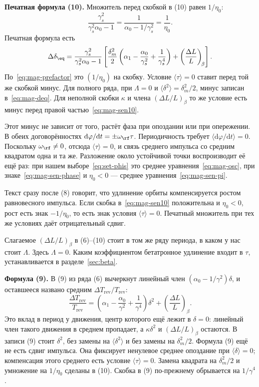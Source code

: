 \textbf{Печатная формула (10).}
Множитель перед скобкой в (10) равен $1/\eta_0$:
\begin{equation}
\label{eq:mag-prefactor}
\frac{\gamma_s^2}{\gamma_s^2\alpha_0-1}
=\frac{1}{\alpha_0-1/\gamma_s^2}
=\frac{1}{\eta_0}.
\end{equation}
Печатная формула есть
\begin{equation}
\label{eq:mag-sen10}
\Delta\delta_\eq
=\frac{\gamma_s^2}{\gamma_s^2\alpha_0-1}
\left[
\frac{\delta_m^2}{2}
\left(
\alpha_1-\frac{\alpha_0}{\gamma_s^2}+\frac{1}{\gamma_s^4}
\right)
+\left(\frac{\Delta L}{L}\right)_{\!\beta}
\right].
\end{equation}
По~\eqref{eq:mag-prefactor} это $(1/\eta_0)$ на скобку. Условие $\langle\tau\rangle=0$ ставит перед той же скобкой минус. Для полного ряда, при $\Lambda=0$ и $\langle\delta^2\rangle=\delta_m^2/2$, минус записан в~\eqref{eq:mag-deq}. Для неполной скобки $\kappa$ и члена $(\Delta L/L)_\beta$ то же условие есть минус перед правой частью~\eqref{eq:mag-sen10}.

Этот минус не зависит от того, растёт фаза при опоздании или при опережении. В обеих договорённостях $\mathrm{d}\varphi/\mathrm{d}t=\pm\omega_\rf\tau$. Периодичность требует $\langle\mathrm{d}\varphi/\mathrm{d}t\rangle=0$. Поскольку $\omega_\rf\neq 0$, отсюда $\langle\tau\rangle=0$, и связь среднего импульса со средним квадратом одна и та же. Разложение около устойчивой точки воспроизводит её ещё раз: при нашем выборе~\eqref{eq:set-phis} это среднее уравнения~\eqref{eq:mag-osc}, при знаке~\eqref{eq:mag-sen-phase} и $\eta_0<0$ --- среднее уравнения~\eqref{eq:mag-sen-pi}.

Текст сразу после (8) говорит, что удлинение орбиты компенсируется ростом равновесного импульса. Если скобка в~\eqref{eq:mag-sen10} положительна и $\eta_0<0$, рост есть знак $-1/\eta_0$, то есть знак условия $\langle\tau\rangle=0$. Печатный множитель при тех же условиях даёт отрицательный сдвиг.

Слагаемое $(\Delta L/L)_\beta$ в (6)--(10) стоит в том же ряду периода, в каком у нас стоит $\Lambda$. Здесь $\Lambda=0$. Каким коэффициентом бетатронное удлинение входит в $\tau$, устанавливается в разделе~\ref{sec:beta}.

\textbf{Формула (9).}
В (9) из ряда (6) вычеркнут линейный член $(\alpha_0-1/\gamma^2)\delta$, и оставшееся названо средним $\Delta T_{\mathrm{rev}}/T_{\mathrm{rev}}$:
\begin{equation}
\label{eq:mag-sen9}
\frac{\Delta T_{\mathrm{rev}}}{T_{\mathrm{rev}}}
=\left(\alpha_1-\frac{\alpha_0}{\gamma^2}+\frac{1}{\gamma^4}\right)\delta^2
+\left(\frac{\Delta L}{L}\right)_{\!\beta}.
\end{equation}
Это вклад в период у движения, центр которого ещё лежит в $\delta=0$: линейный член такого движения в среднем пропадает, а $\kappa\delta^2$ и $(\Delta L/L)_\beta$ остаются. В записи (9) стоит $\delta^2$, без замены на $\langle\delta^2\rangle$ и без замены на $\delta_m^2/2$. Формула (9) ещё не есть сдвиг импульса. Она фиксирует ненулевое среднее опоздание при $\langle\delta\rangle=0$; компенсация этого среднего есть условие $\langle\tau\rangle=0$. Замена квадрата на $\delta_m^2/2$ и умножение на $1/\eta_0$ сделаны в (10). Скобка в (9) по-прежнему обрывается на $1/\gamma^4$.
